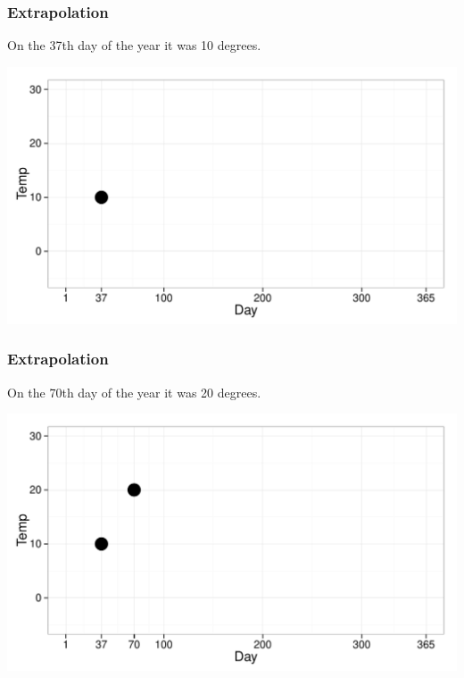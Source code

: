 \documentclass{beamer}\usepackage{graphicx, color}
\makeatletter
\def\maxwidth{ %
  \ifdim\Gin@nat@width>\linewidth
    \linewidth
  \else
    \Gin@nat@width
  \fi
}
\newenvironment{knitrout}{}{} %
\makeatother
\begin{document}
\begin{frame}[fragile]
  \frametitle{Extrapolation}
  On the 37th day of the year it was 10 degrees.
\begin{knitrout}
\color{fgcolor}

{\centering \includegraphics[width=\maxwidth]{figure/Extrap1} 

}


\end{knitrout}

\end{frame}

\begin{frame}[fragile]
  \frametitle{Extrapolation}
  On the 70th day of the year it was 20 degrees.
\begin{knitrout}
\color{fgcolor}

{\centering \includegraphics[width=\maxwidth]{figure/Extrap2} 

}


\end{knitrout}

\end{frame}
\end{document}
